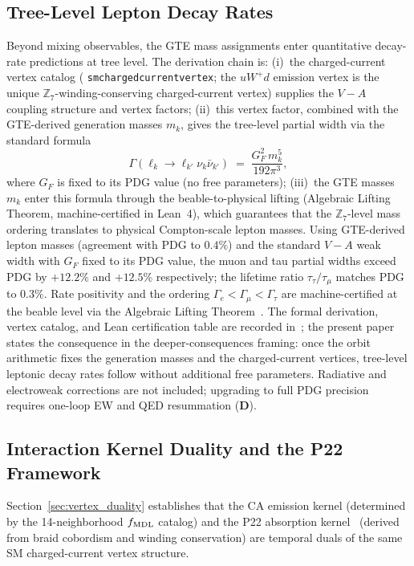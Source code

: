 \documentclass[11pt]{article}
\theoremstyle{remark}
\newcommand{\lean}[1]{%
  \penalty-100
  \begingroup\def\_{\textunderscore\allowbreak}\texttt{#1}\endgroup}
\newcommand{\CatD}{\textbf{D}}
\begin{document}
\subsection{Tree-Level Lepton Decay Rates}
\label{sec:decay_rates}

Beyond mixing observables, the GTE mass assignments enter quantitative
decay-rate predictions at tree level.
The derivation chain is: (i)~the charged-current vertex catalog
(\lean{sm\_charged\_current\_vertex}; the $u W^+ d$ emission vertex is the
unique $\mathbb{Z}_7$-winding-conserving charged-current vertex) supplies the
$V\!-\!A$ coupling structure and vertex factors; (ii)~this vertex factor,
combined with the GTE-derived generation masses $m_k$, gives the tree-level
partial width via the standard formula
\[
  \Gamma(\ell_k \to \ell_{k'}\nu_k\bar\nu_{k'})
  \;=\; \frac{G_F^2\,m_k^5}{192\pi^3},
\]
where $G_F$ is fixed to its PDG value (no free parameters); (iii)~the GTE
masses $m_k$ enter this formula through the beable-to-physical lifting
(Algebraic Lifting Theorem, machine-certified in Lean~4), which guarantees
that the $\mathbb{Z}_7$-level mass ordering translates to physical Compton-scale
lepton masses.
Using GTE-derived lepton masses (agreement with PDG to $0.4\%$) and the
standard $V\!-\!A$ weak width with $G_F$ fixed to its PDG value, the
muon and tau partial widths exceed PDG by $+12.2\%$ and $+12.5\%$
respectively; the lifetime ratio $\tau_\tau/\tau_\mu$ matches PDG to
$0.3\%$.
Rate positivity and the ordering $\Gamma_e < \Gamma_\mu < \Gamma_\tau$
are machine-certified at the beable level via the Algebraic Lifting
Theorem~\cite{SpivackCompUniversality}.
The formal derivation, vertex catalog, and Lean certification table
are recorded in~\cite{SpivackCompUniversality}; the present paper
states the consequence in the deeper-consequences framing: once the
orbit arithmetic fixes the generation masses and the charged-current
vertices, tree-level leptonic decay rates follow without additional
free parameters.
Radiative and electroweak corrections are not included; upgrading to
full PDG precision requires one-loop EW and QED resummation (\CatD{}).

\subsection{Interaction Kernel Duality and the P22 Framework}

Section~\ref{sec:vertex_duality} establishes that the CA emission kernel (determined by
the 14-neighborhood $f_{\rm MDL}$ catalog) and the P22 absorption
kernel~\cite{Spivack2026_UGPDynamics} (derived from braid cobordism and winding
conservation) are temporal duals of the same SM charged-current vertex structure.
\end{document}
